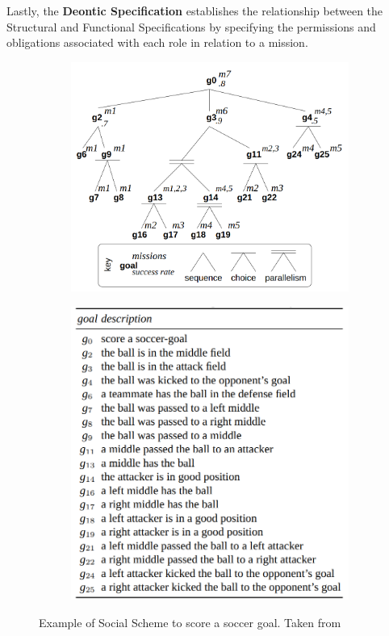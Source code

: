 Lastly, the \textbf{Deontic Specification} establishes the relationship between the Structural and Functional Specifications by specifying the permissions and obligations associated with each role in relation to a mission.

\begin{figure}[!h]
    \centering
    \begin{subfigure}{.44\linewidth}
        \centering
        \includegraphics[width=\linewidth]{chapters/background/images/Moise - Social Scheme.png}
    \end{subfigure}
    \hfill
    \begin{subfigure}{.55\linewidth}
        \centering
        \includegraphics[width=0.8\linewidth]{chapters/background/images/Moise - Goals Descriptions.png}
    \end{subfigure}
    \caption{Example of Social Scheme to score a soccer goal. Taken from \cite{MOISEp}}
    \label{fig:moise_fs}
\end{figure}

